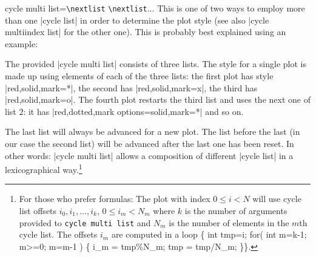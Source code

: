 \begin{pgfplotskey}{%
    cycle multi list=\texttt{\textbackslash nextlist}%
    \texttt{\textbackslash nextlist}$\ldots$
}
    This
    is one of two ways to employ more than one |cycle list| in order to
    determine the plot style (see also |cycle multiindex list| for the other
    one). This is probably best explained using an example:
\begin{codeexample}[]
\end{codeexample}
    \noindent The provided |cycle multi list| consists of three lists. The
    style for a single plot is made up using elements of each of the three
    lists: the first plot has style |red,solid,mark=*|, the second has
    |red,solid,mark=x|, the third has |red,solid,mark=o|. The fourth plot
    restarts the third list and uses the next one of list $2$: it has
    |red,dotted,mark options={solid},mark=*| and so on.

    The last list will always be advanced for a new plot. The list before the
    last (in our case the second list) will be advanced after the last one has
    been reset. In other words: |cycle multi list| allows a composition of
    different |cycle list| in a lexicographical way.\footnote{For those who
    prefer formulas: The plot with index $0 \le i < N$ will use cycle list
    offsets $i_0,i_1,\dotsc,i_k$, $0 \le i_m < N_m$ where $k$ is the number of
    arguments provided to \texttt{cycle multi list} and $N_m$ is the number of
    elements in the $m$th cycle list. The offsets $i_m$ are computed in a loop
    {\ttfamily \{ int tmp=i;  for( int m=k-1; m>=0; m=m-1 ) \{ i\_m =
    tmp\%N\_m; tmp = tmp/N\_m; \}\}}.}


\end{pgfplotskey}
